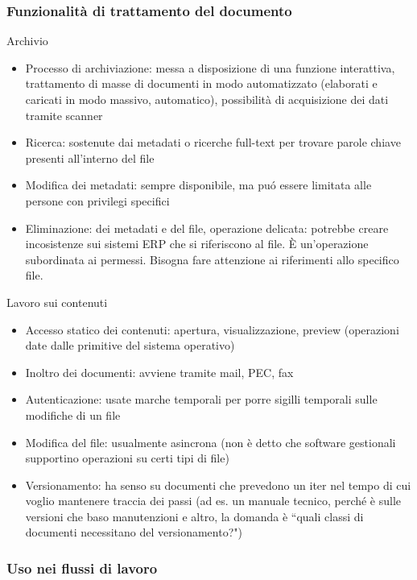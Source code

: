 \subsubsection{Funzionalit\`a di trattamento del
documento}

Archivio

\begin{itemize}

\item
  Processo di archiviazione: messa a disposizione di una funzione
  interattiva, trattamento di masse di documenti in modo automatizzato
  (elaborati e caricati in modo massivo, automatico), possibilit\`a di
  acquisizione dei dati tramite scanner
\item
  Ricerca: sostenute dai metadati o ricerche full-text per trovare
  parole chiave presenti all'interno del file
\item
  Modifica dei metadati: sempre disponibile, ma pu\'o essere limitata alle
  persone con privilegi specifici
\item
  Eliminazione: dei metadati e del file, operazione delicata: potrebbe
  creare incosistenze sui sistemi ERP che si riferiscono al file. È
  un'operazione subordinata ai permessi.
  Bisogna fare attenzione ai riferimenti allo specifico file.
\end{itemize}

Lavoro sui contenuti

\begin{itemize}

\item
  Accesso statico dei contenuti: apertura, visualizzazione, preview
  (operazioni date dalle primitive del sistema operativo)
\item
  Inoltro dei documenti: avviene tramite mail, PEC, fax
\item
  Autenticazione: usate marche temporali per porre sigilli temporali
  sulle modifiche di un file
\item
  Modifica del file: usualmente asincrona (non \`e detto che software
  gestionali supportino operazioni su certi tipi di file)
\item
  Versionamento: ha senso su documenti che prevedono un iter nel tempo
  di cui voglio mantenere traccia dei passi (ad es. un manuale tecnico,
  perch\'e \`e sulle versioni che baso manutenzioni e altro, la domanda \`e
  ``quali classi di documenti necessitano del versionamento?")
\end{itemize}

\subsubsection{Uso nei flussi di lavoro}

